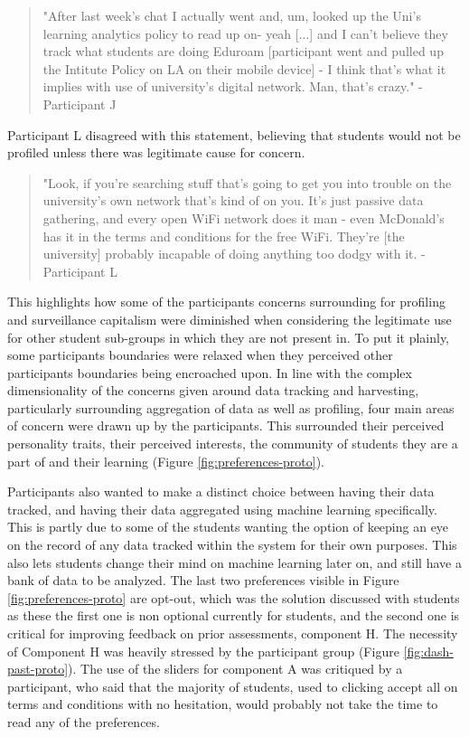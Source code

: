 \documentclass{l4proj}
\begin{document}
\begin{quote}
    "After last week's chat I actually went and, um, looked up the Uni's learning analytics policy to read up on- yeah [...] and I can't believe they track what students are doing Eduroam [participant went and pulled up the Intitute Policy on LA on their mobile device] - I think that's what it implies with use of university's digital network. Man, that's crazy." - Participant J
\end{quote}

Participant L disagreed with this statement, believing that students would not be profiled unless there was legitimate cause for concern. 

\begin{quote}
    "Look, if you're searching stuff that's going to get you into trouble on the university's own network that's kind of on you. It's just passive data gathering, and every open WiFi network does it man - even McDonald's has it in the terms and conditions for the free WiFi. They're [the university] probably incapable of doing anything too dodgy with it. - Participant L
\end{quote}

This highlights how some of the participants concerns surrounding for profiling and surveillance capitalism were diminished when considering the legitimate use for other student sub-groups in which they are not present in. To put it plainly, some participants boundaries were relaxed when they perceived other participants boundaries being encroached upon.  In line with the complex dimensionality of the concerns given around data tracking and harvesting, particularly surrounding aggregation of data as well as profiling, four main areas of concern were drawn up by the participants. This surrounded their perceived personality traits, their perceived interests, the community of students they are a part of and their learning  (Figure \ref{fig:preferences-proto}). 

Participants also wanted to make a distinct choice between having their data tracked, and having their data aggregated using machine learning specifically. This is partly due to some of the students wanting the option of keeping an eye on the record of any data tracked within the system for their own purposes. This also lets students change their mind on machine learning later on, and still have a bank of data to be analyzed. The last two preferences visible in Figure \ref{fig:preferences-proto} are opt-out, which was the solution discussed with students as these the first one is non optional currently for students, and the second one is critical for improving feedback on prior assessments, component H. The necessity of Component H was heavily stressed by the participant group (Figure \ref{fig:dash-past-proto}). The use of the sliders for component A was critiqued by a participant, who said that the majority of students, used to clicking accept all on terms and conditions with no hesitation, would probably not take the time to read any of the preferences. 
\end{document}
